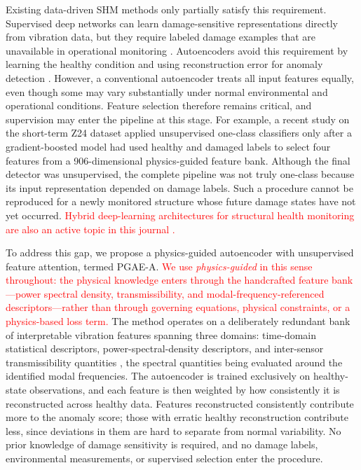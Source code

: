 \documentclass[11pt,a4paper]{article}
\begin{document}
Existing data-driven SHM methods only partially satisfy this requirement.
Supervised deep networks can learn damage-sensitive representations directly from
vibration data, but they require labeled damage examples that are unavailable in
operational monitoring \cite{abdeljaber2017}. Autoencoders avoid this requirement
by learning the healthy condition and using reconstruction error for anomaly
detection \cite{ni2020,okur2025,shang2021dcae}. However, a conventional
autoencoder treats all input features equally, even though some may vary
substantially under normal environmental and operational conditions. Feature
selection therefore remains critical, and supervision may enter the pipeline at
this stage. For example, a recent study on the short-term Z24 dataset
\cite{abdrabo2024} applied unsupervised one-class classifiers only after a
gradient-boosted model had used healthy and damaged labels to select four
features from a 906-dimensional physics-guided feature bank. Although the final
detector was unsupervised, the complete pipeline was not truly one-class because
its input representation depended on damage labels. Such a procedure cannot be
reproduced for a newly monitored structure whose future damage states have not
yet occurred.
\textcolor{red}{Hybrid deep-learning architectures for structural health
monitoring are also an active topic in this journal \cite{hong2026}.}

To address this gap, we propose a physics-guided autoencoder with unsupervised
feature attention, termed PGAE-A.
\textcolor{red}{We use \emph{physics-guided} in this sense throughout: the
physical knowledge enters through the handcrafted feature bank---power
spectral density, transmissibility, and modal-frequency-referenced
descriptors---rather than through governing equations, physical constraints,
or a physics-based loss term.}
The method operates on a deliberately redundant
bank of interpretable vibration features spanning three domains: time-domain
statistical descriptors, power-spectral-density descriptors, and inter-sensor
transmissibility quantities \cite{johnson2002}, the spectral quantities being
evaluated around the identified modal frequencies. The autoencoder is trained
exclusively on healthy-state observations, and each feature is then weighted by
how consistently it is reconstructed across healthy data. Features reconstructed
consistently contribute more to the anomaly score; those with erratic healthy
reconstruction contribute less, since deviations in them are hard to separate
from normal variability. No prior knowledge of damage sensitivity is required,
and no damage labels, environmental measurements, or supervised selection enter
the procedure.
\end{document}
